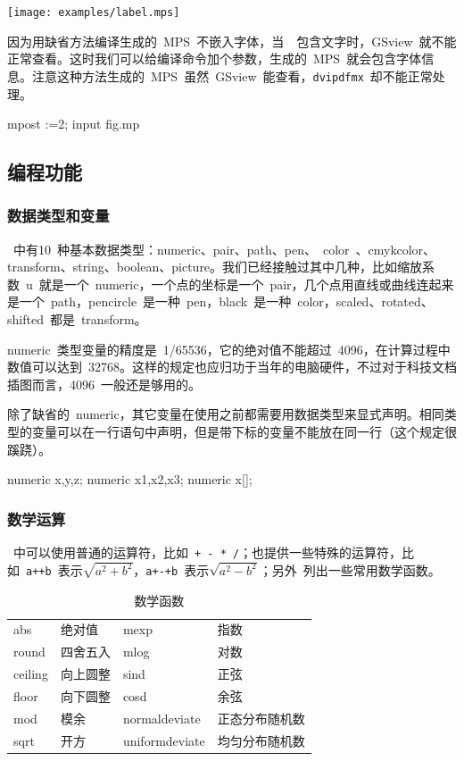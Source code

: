 \begin{out}
\texttt{[image: examples/label.mps]}
\end{out}

因为用缺省方法编译生成的~MPS~不嵌入字体，当~\MP~包含文字时，GSview~就不能正常查看。这时我们可以给编译命令加个参数，生成的~MPS~就会包含字体信息。注意这种方法生成的~MPS~虽然~GSview~能查看，\verb|dvipdfmx|~却不能正常处理。

\begin{code}
mpost \prologues:=2; input fig.mp
\end{code}

\subsection{编程功能}

\subsubsection{数据类型和变量}
\MP~中有10~种基本数据类型：numeric、pair、path、pen、~color~、cmykcolor、transform、string、boolean、picture。我们已经接触过其中几种，比如缩放系数~u~就是一个~numeric，一个点的坐标是一个~pair，几个点用直线或曲线连起来是一个~path，pencircle~是一种~pen，black~是一种~color，scaled、rotated、shifted~都是~transform。

numeric~类型变量的精度是~1/65536，它的绝对值不能超过~4096，在计算过程中数值可以达到~32768。这样的规定也应归功于当年的电脑硬件，不过对于科技文档插图而言，4096~一般还是够用的。

除了缺省的~numeric，其它变量在使用之前都需要用数据类型来显式声明。相同类型的变量可以在一行语句中声明，但是带下标的变量不能放在同一行（这个规定很蹊跷）。
\begin{code}
numeric x,y,z;    %
numeric x1,x2,x3; %
numeric x[];      %
\end{code}

\subsubsection{数学运算}
\MP~中可以使用普通的运算符，比如~\verb|+ - * /|；也提供一些特殊的运算符，比如~\verb|a++b|~表示$\sqrt{a^2+b^2}$，\verb|a+-+b|~表示$\sqrt{a^2-b^2}$；另外~列出一些常用数学函数。

\begin{table}[htbp]
\caption{数学函数}
\label{tab:math_function}
\centering
\begin{tabular}{llll}
    \toprule
    abs     & 绝对值   & mexp & 指数 \\
    round   & 四舍五入 & mlog & 对数 \\
    ceiling & 向上圆整 & sind & 正弦 \\
    floor   & 向下圆整 & cosd & 余弦 \\
    mod     & 模余     & normaldeviate & 正态分布随机数 \\
    sqrt    & 开方     & uniformdeviate & 均匀分布随机数 \\
    \bottomrule
\end{tabular}
\end{table}

